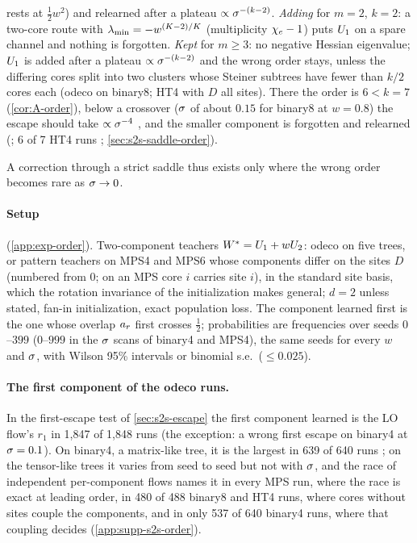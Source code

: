 \begin{enumerate}[label=(\roman*)]
    rests at $\frac12w^2$) and relearned after a plateau $\propto\sigma^{-(k-2)}$. \emph{Adding} for $m=2$, $k=2$: a
    two-core route with $\lambda_{\min}=-w^{(K-2)/K}$ (multiplicity $\chi_{e}-1$) puts $U_{1}$ on a spare channel and
    nothing is forgotten. \emph{Kept} for $m\ge3$: no negative Hessian eigenvalue; $U_{1}$ is added after a plateau
    $\propto\sigma^{-(k-2)}$ and the wrong order stays, unless the differing cores split into two clusters whose
    Steiner subtrees have fewer than $k/2$ cores each (odeco on binary8; HT4 with $D$ all sites). There the order
    is $6<k=7$ \proven{} (\cref{cor:A-order}), below a crossover ($\sigma$ of about $0.15$ for binary8 at $w=0.8$)
    the escape should take $\propto\sigma^{-4}$ \derived, and the smaller component is forgotten and relearned
    (\conjecture; 6 of 7 HT4 runs \empirical; \cref{sec:s2s-saddle-order}).
\end{enumerate}
A correction through a strict saddle thus exists only where the wrong order becomes rare as $\sigma\to0$.

\paragraph{Setup} (\cref{app:exp-order}).
Two-component teachers $W^{*}=U_{1}+wU_{2}$: odeco on five trees, or pattern teachers on MPS4 and MPS6 whose components
differ on the sites $D$ (numbered from $0$; on an MPS core $i$ carries site $i$), in the standard site basis, which
the rotation invariance of the initialization makes general; $d=2$ unless stated, fan-in initialization, exact
population loss. The component learned first is the one whose overlap $a_{r}$ first crosses $\frac12$; probabilities
are frequencies over seeds $0$--$399$ ($0$--$999$ in the $\sigma$ scans of binary4 and MPS4), the same seeds for
every $w$ and $\sigma$, with Wilson 95\% intervals or binomial s.e.\ ($\le0.025$).

\paragraph{The first component of the odeco runs.}
\empirical{} In the first-escape test of \cref{sec:s2s-escape} the first component learned is the LO flow's $r_1$
in 1,847 of 1,848 runs (the exception: a wrong first escape on binary4 at $\sigma=0.1$). On binary4, a matrix-like
tree, it is the largest in 639 of 640 runs ; on the tensor-like trees it varies from seed to seed but not with $\sigma$, and the race of
independent per-component flows names it in every MPS run, where the race is exact at leading order, in 480 of 488
binary8 and HT4 runs, where cores without sites couple the components, and in only 537 of 640 binary4 runs, where
that coupling decides (\cref{app:supp-s2s-order}).

